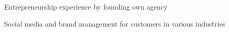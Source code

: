 
\begin{tightitemize}
\item Entrepreneurship experience by founding own agency
\item Social media and brand management for customers in various industries
\end{tightitemize}

\sectionspace %

\begin{comment}

\runsubsection{TAF- METU Modelling and Simulation Center}
\descript{| Intern}

\location{July 2012 – September 2012 | Ankara, Turkey}
\begin{tightitemize}
\item Implementing Articial Neural Networks into 3D SPH Simulations
\end{tightitemize}

\sectionspace %


\runsubsection{Aselsan Inc.}
\descript{| Intern}

\location{June 2011 – July 2011 | Ankara, Turkey}
\begin{tightitemize}
\item Production and Planning Directorate
\end{tightitemize}

\sectionspace %


\runsubsection{Havelsan Inc.}
\descript{| Intern}

\location{August 2010 – September 2010 | Ankara, Turkey}
\begin{tightitemize}
\item Simulation and Training Systems Directorate
\end{tightitemize}

\sectionspace %

\end{comment}

